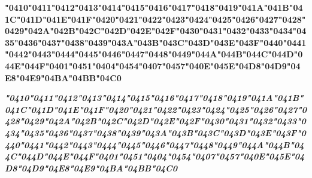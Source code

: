 {\LibertinusSerifPatch\bfseries 
	\char"0410\gs \char"0411\gs \char"0412\gs \char"0413\gs \char"0414\gs \char"0415\gs \char"0416\gs \char"0417\gs \char"0418\gs \char"0419\gs \char"041A\gs \char"041B\gs \char"041C\gs \char"041D\gs \char"041E\gs \char"041F\gs \char"0420\gs \char"0421\gs \char"0422\gs \char"0423\gs \char"0424\gs \char"0425\gs \char"0426\gs \char"0427\gs \char"0428\gs \char"0429\gs \char"042A\gs \char"042B\gs \char"042C\gs \char"042D\gs \char"042E\gs \char"042F\gs \char"0430\gs \char"0431\gs \char"0432\gs \char"0433\gs \char"0434\gs \char"0435\gs \char"0436\gs \char"0437\gs \char"0438\gs \char"0439\gs \char"043A\gs \char"043B\gs \char"043C\gs \char"043D\gs \char"043E\gs \char"043F\gs \char"0440\gs \char"0441\gs \char"0442\gs \char"0443\gs \char"0444\gs \char"0445\gs \char"0446\gs \char"0447\gs \char"0448\gs \char"0449\gs \char"044A\gs \char"044B\gs \char"044C\gs \char"044D\gs \char"044E\gs \char"044F\gs \char"0401\gs \char"0451\gs \char"0404\gs \char"0454\gs \char"0407\gs \char"0457\gs \char"040E\gs \char"045E\gs \char"04D8\gs \char"04D9\gs \char"04E8\gs \char"04E9\gs \char"04BA\gs \char"04BB\gs \char"04C0\gs
}

{\LibertinusSerifPatch\itshape\bfseries 
	\char"0410\gs \char"0411\gs \char"0412\gs \char"0413\gs \char"0414\gs \char"0415\gs \char"0416\gs \char"0417\gs \char"0418\gs \char"0419\gs \char"041A\gs \char"041B\gs \char"041C\gs \char"041D\gs \char"041E\gs \char"041F\gs \char"0420\gs \char"0421\gs \char"0422\gs \char"0423\gs \char"0424\gs \char"0425\gs \char"0426\gs \char"0427\gs \char"0428\gs \char"0429\gs \char"042A\gs \char"042B\gs \char"042C\gs \char"042D\gs \char"042E\gs \char"042F\gs \char"0430\gs \char"0431\gs \char"0432\gs \char"0433\gs \char"0434\gs \char"0435\gs \char"0436\gs \char"0437\gs \char"0438\gs \char"0439\gs \char"043A\gs \char"043B\gs \char"043C\gs \char"043D\gs \char"043E\gs \char"043F\gs \char"0440\gs \char"0441\gs \char"0442\gs \char"0443\gs \char"0444\gs \char"0445\gs \char"0446\gs \char"0447\gs \char"0448\gs \char"0449\gs \char"044A\gs \char"044B\gs \char"044C\gs \char"044D\gs \char"044E\gs \char"044F\gs \char"0401\gs \char"0451\gs \char"0404\gs \char"0454\gs \char"0407\gs \char"0457\gs \char"040E\gs \char"045E\gs \char"04D8\gs \char"04D9\gs \char"04E8\gs \char"04E9\gs \char"04BA\gs \char"04BB\gs \char"04C0\gs
}
